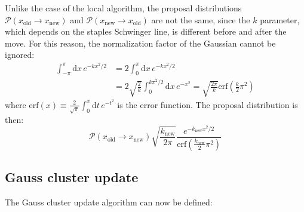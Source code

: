 Unlike the case of the local algorithm,
the proposal distributions $\mathcal P(x_\mathrm{old}\to x_\mathrm{new})$ and $\mathcal P(x_\mathrm{new}\to x_\mathrm{old})$
are not the same, since the $k$ parameter,
which depends on the staples Schwinger line, is different before and after the move.
For this reason, the normalization factor of the Gaussian cannot be ignored:
\[\begin{aligned}
    \int_{-\pi}^\pi\mathrm dx\,e^{-kx^2/2} &= 2\int_0^\pi\mathrm dx\,e^{-kx^2/2} \\
                                           &= 2\sqrt{\frac{2}{k}}\int_0^{k\pi^2/2}\mathrm dx\,e^{-x^2} = \sqrt{\frac{2\pi}{k}}\mathrm{erf}\left(\frac{k}{2}\pi^2\right)
\end{aligned}\]
where $\mathrm{erf}(x) \equiv \frac{2}{\sqrt\pi}\int_0^x\mathrm dt\,e^{-t^2}$ is the error function.
The proposal distribution is then:
\begin{equation}\label{eq:gauss_cluster_proposal}
    \mathcal P(x_\mathrm{old}\to x_\mathrm{new})\sqrt{\frac{k_\mathrm{new}}{2\pi}}\frac{e^{-k_\mathrm{new}x^2/2}}{\mathrm{erf}\left(\frac{k_\mathrm{new}}{2}\pi^2\right)}
\end{equation}

\subsection{Gauss cluster update}

The Gauss cluster update algorithm can now be defined:

